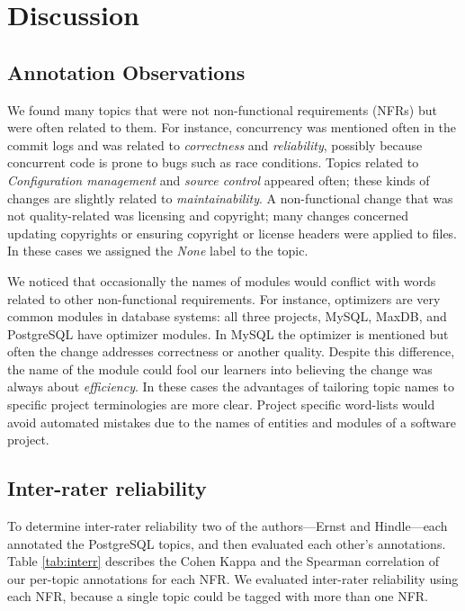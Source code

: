 \documentclass[smallextended]{svjour3}       %
\begin{document}
\section{Discussion}
\label{sec:limit}

\subsection{Annotation Observations}
We found many topics that were not non-functional requirements (NFRs) but were often related to them. 
For instance, concurrency was mentioned often in the commit logs and
was related to \emph{correctness} and \emph{reliability}, possibly because concurrent code is prone to bugs such as race conditions. %
Topics related to \emph{Configuration management} and \emph{source control} appeared often; %
these kinds of changes are slightly related to \emph{maintainability}. 
A non-functional change that was not quality-related was licensing and
copyright; many changes concerned updating copyrights or
ensuring copyright or license headers were applied to files. In these
cases we assigned the \emph{None} label to the topic.

We noticed that occasionally the names of modules would conflict with words related to other non-functional requirements. 
For instance, optimizers are very common modules in database systems:
all three projects, MySQL, MaxDB, and PostgreSQL have optimizer modules. 
In MySQL the optimizer is mentioned but often the change addresses  correctness or another quality. 
Despite this difference, the name of the module could fool our learners into believing the change was always about \emph{efficiency}. 
In these cases the advantages of tailoring topic names to specific project terminologies are more clear. 
Project specific word-lists would avoid automated mistakes due to the names of entities and modules of a software project.

\subsection{Inter-rater reliability}
\label{sec:inter-rater}
To determine inter-rater reliability two of the authors---Ernst and Hindle---each annotated the PostgreSQL topics,
and then evaluated each other's annotations. 
Table \ref{tab:interr} describes the Cohen Kappa and the Spearman
correlation of our per-topic annotations for each NFR. We 
evaluated inter-rater reliability using each NFR, because a single topic could be
tagged with more than one NFR.
\end{document}
